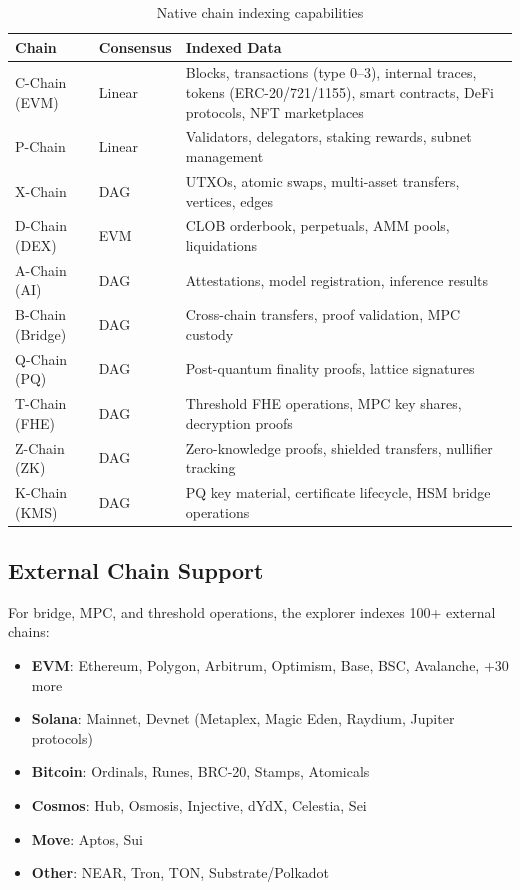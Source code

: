 \documentclass[11pt,a4paper]{article}
\begin{document}
\begin{table}[H]
\centering
\begin{tabularx}{\textwidth}{llX}
\toprule
\textbf{Chain} & \textbf{Consensus} & \textbf{Indexed Data} \\
\midrule
C-Chain (EVM) & Linear & Blocks, transactions (type 0--3), internal traces, tokens (ERC-20/721/1155), smart contracts, DeFi protocols, NFT marketplaces \\
P-Chain & Linear & Validators, delegators, staking rewards, subnet management \\
X-Chain & DAG & UTXOs, atomic swaps, multi-asset transfers, vertices, edges \\
D-Chain (DEX) & EVM & CLOB orderbook, perpetuals, AMM pools, liquidations \\
A-Chain (AI) & DAG & Attestations, model registration, inference results \\
B-Chain (Bridge) & DAG & Cross-chain transfers, proof validation, MPC custody \\
Q-Chain (PQ) & DAG & Post-quantum finality proofs, lattice signatures \\
T-Chain (FHE) & DAG & Threshold FHE operations, MPC key shares, decryption proofs \\
Z-Chain (ZK) & DAG & Zero-knowledge proofs, shielded transfers, nullifier tracking \\
K-Chain (KMS) & DAG & PQ key material, certificate lifecycle, HSM bridge operations \\
\bottomrule
\end{tabularx}
\caption{Native chain indexing capabilities}
\end{table}

\subsection{External Chain Support}

For bridge, MPC, and threshold operations, the explorer indexes 100+ external chains:

\begin{itemize}
  \item \textbf{EVM}: Ethereum, Polygon, Arbitrum, Optimism, Base, BSC, Avalanche, +30 more
  \item \textbf{Solana}: Mainnet, Devnet (Metaplex, Magic Eden, Raydium, Jupiter protocols)
  \item \textbf{Bitcoin}: Ordinals, Runes, BRC-20, Stamps, Atomicals
  \item \textbf{Cosmos}: Hub, Osmosis, Injective, dYdX, Celestia, Sei
  \item \textbf{Move}: Aptos, Sui
  \item \textbf{Other}: NEAR, Tron, TON, Substrate/Polkadot
\end{itemize}
\end{document}
